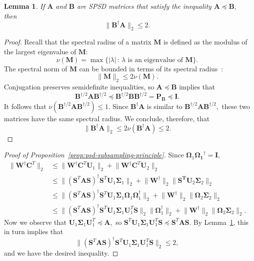\documentclass[11pt,letterpaper,twoside,reqno,nosumlimits]{amsart}
\def\pinv{\dagger}
\def\transp{T}
\newcommand{\mat}[1]{\ensuremath{\mathbf{#1}}}
\newcommand{\snorm}[1]{\ensuremath{\big\|#1\big\|_2}}
\newtheorem{lemma}{Lemma}
\theoremstyle{remark}
\begin{document}
\begin{lemma}
 \label{lem:posmatprod}
 If $\mat{A}$ and $\mat{B}$ are SPSD matrices that satisfy the inequality $\mat{A} \preceq \mat{B},$ then
 $$ \snorm{\mat{B}^\dagger \mat{A}} \leq 2. $$
\end{lemma}

\begin{proof}
 Recall that the spectral radius of a matrix $\mat{M}$ is defined as the modulus of the largest eigenvalue of $\mat{M}:$
 \[
  \nu(\mat{M}) = \max \{ |\lambda|\,:\, \lambda \text{ is an eigenvalue of } \mat{M}\}.
 \]
 The spectral norm of $\mat{M}$ can be bounded in terms of its spectral radius~\cite{HJ94}:
 \[
 \snorm{\mat{M}} \leq 2 \nu(\mat{M}). 
 \]
 Conjugation preserves semidefinite inequalities, so $\mat{A} \preceq \mat{B}$ implies that
 \[
  \mat{B}^{\dagger/2} \mat{A} \mat{B}^{\dagger/2} \preceq \mat{B}^{\dagger/2} \mat{B}  \mat{B}^{\dagger/2} = \mat{P}_{\mat{B}} \preceq \mat{I}.
 \]
 It follows that $\nu(\mat{B}^{\dagger/2} \mat{A} \mat{B}^{\dagger/2}) \leq 1.$ Since $\mat{B}^{\dagger} \mat{A}$ is similar to $\mat{B}^{\dagger/2} \mat{A} \mat{B}^{\dagger/2},$ these two matrices have the same spectral radius. We conclude, therefore, that
 \[
  \snorm{\mat{B}^\dagger \mat{A}} \leq 2\nu(\mat{B}^\dagger \mat{A}) \leq 2.
 \]

\end{proof}

\begin{proof}[Proof of Proposition~\ref{prop:psd-subsampling-principle}]
 Since $\mat{\Omega}_1 \mat{\Omega_1}^\pinv = \mat{I},$
\[
 \begin{aligned}
 \snorm{\mat{W}^\pinv \mat{C}^\transp} & \leq \snorm{\mat{W}^\pinv \mat{C}^\transp \mat{U}_1} + \snorm{\mat{W}^\pinv \mat{C}^\transp \mat{U}_2 } \\
      & \leq \snorm{(\mat{S}^\transp \mat{A} \mat{S})^\dagger \mat{S}^\transp \mat{U}_1 \mat{\Sigma}_1} + \snorm{\mat{W}^\pinv} \snorm{\mat{S^\transp} \mat{U}_2 \mat{\Sigma}_2 } \\
      & \leq \snorm{(\mat{S}^\transp \mat{A} \mat{S})^\dagger \mat{S}^\transp \mat{U}_1 \mat{\Sigma}_1 \mat{\Omega}_1 \mat{\Omega}_1^\pinv} + \snorm{\mat{W}^\pinv} \snorm{\mat{\Omega}_2 \mat{\Sigma}_2} \\
      & \leq \snorm{(\mat{S}^\transp \mat{A} \mat{S})^\dagger \mat{S}^\transp \mat{U}_1 \mat{\Sigma}_1 \mat{U}_1^\transp \mat{S}} \snorm{\mat{\Omega}_1^\pinv} + \snorm{\mat{W}^\pinv} \snorm{\mat{\Omega}_2 \mat{\Sigma}_2}.
 \end{aligned}
\]
Now we observe that $\mat{U}_1 \mat{\Sigma}_1 \mat{U}_1^\transp \preceq \mat{A},$ so $\mat{S}^\transp \mat{U}_1 \mat{\Sigma}_1 \mat{U}_1^\transp\mat{S} \preceq \mat{S}^\transp \mat{A} \mat{S}.$ By Lemma~\ref{lem:posmatprod}, this in turn implies that
\[
 \snorm{(\mat{S}^\transp \mat{A} \mat{S})^\dagger \mat{S}^\transp \mat{U}_1 \mat{\Sigma}_1 \mat{U}_1^\transp \mat{S}} \leq 2,
\]
and we have the desired inequality.
\end{proof}
\end{document}
